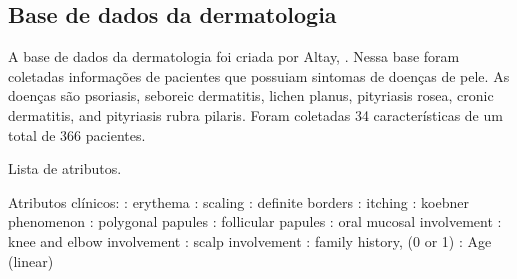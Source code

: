 \documentclass[ 
	article,			%
	11pt,				%
	oneside,			%
	a4paper,			%
	english,			%
	brazil,				%
	]{abntex2}
\begin{document}
\subsection{Base de dados da dermatologia}
A base de dados da dermatologia foi criada por Altay, \cite{gvenir1998learning}.
Nessa base foram coletadas informações de pacientes que possuiam sintomas de
doenças de pele. As doenças são psoriasis, seboreic dermatitis, lichen planus,
pityriasis rosea, cronic dermatitis, and pityriasis rubra pilaris. Foram
coletadas 34 características de um total de 366 pacientes.

Lista de atributos.

Atributos clínicos: : erythema : scaling : definite borders : itching : koebner phenomenon : polygonal papules : follicular papules : oral mucosal involvement : knee and elbow involvement : scalp involvement : family history, (0 or 1) : Age (linear) \newline
\end{document}
